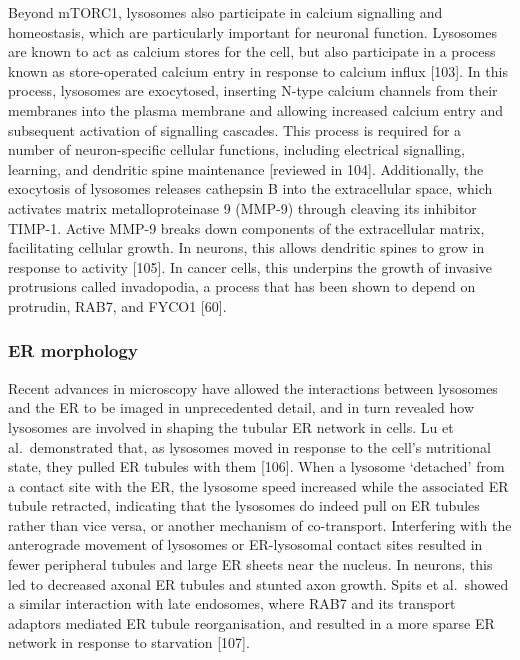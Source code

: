 \documentclass[
  12pt,
  a4paper,
]{book}
\begin{document}
Beyond mTORC1, lysosomes also participate in calcium signalling and homeostasis, which are particularly important for neuronal function. Lysosomes are known to act as calcium stores for the cell, but also participate in a process known as store-operated calcium entry in response to calcium influx {[}103{]}. In this process, lysosomes are exocytosed, inserting N-type calcium channels from their membranes into the plasma membrane and allowing increased calcium entry and subsequent activation of signalling cascades. This process is required for a number of neuron-specific cellular functions, including electrical signalling, learning, and dendritic spine maintenance {[}reviewed in 104{]}. Additionally, the exocytosis of lysosomes releases cathepsin B into the extracellular space, which activates matrix metalloproteinase 9 (MMP-9) through cleaving its inhibitor TIMP-1. Active MMP-9 breaks down components of the extracellular matrix, facilitating cellular growth. In neurons, this allows dendritic spines to grow in response to activity {[}105{]}. In cancer cells, this underpins the growth of invasive protrusions called invadopodia, a process that has been shown to depend on protrudin, RAB7, and FYCO1 {[}60{]}.

\hypertarget{er-morphology}{%
\subsubsection{ER morphology}\label{er-morphology}}

Recent advances in microscopy have allowed the interactions between lysosomes and the ER to be imaged in unprecedented detail, and in turn revealed how lysosomes are involved in shaping the tubular ER network in cells. Lu et al.~demonstrated that, as lysosomes moved in response to the cell's nutritional state, they pulled ER tubules with them {[}106{]}. When a lysosome `detached' from a contact site with the ER, the lysosome speed increased while the associated ER tubule retracted, indicating that the lysosomes do indeed pull on ER tubules rather than vice versa, or another mechanism of co-transport. Interfering with the anterograde movement of lysosomes or ER-lysosomal contact sites resulted in fewer peripheral tubules and large ER sheets near the nucleus. In neurons, this led to decreased axonal ER tubules and stunted axon growth. Spits et al.~showed a similar interaction with late endosomes, where RAB7 and its transport adaptors mediated ER tubule reorganisation, and resulted in a more sparse ER network in response to starvation {[}107{]}.
\end{document}
